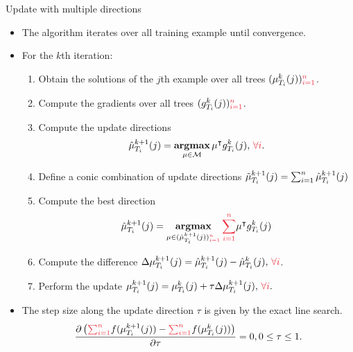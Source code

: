 \documentclass[first=dgreen,second=purple,logo=yellowexc]{aaltoslides}
\begin{document}
\begin{frame}{Update with multiple directions}
	\begin{itemize}\footnotesize
		\item The algorithm iterates over all training example until convergence.
		\item For the $k$th iteration:
		\begin{enumerate}\footnotesize
			\item Obtain the solutions of the $j$th example over all trees $(\vmu_{T_i}^k(j)){\color{aaltored}_{i=1}^n}$.
			\item Compute the gradients over all trees $(g_{T_i}^k(j)){\color{aaltored}_{i=1}^n}$.
			\item Compute the update directions
			\begin{align*}
				\hat{\vmu}_{T_i}^{k+1}(j) = \underset{\vmu\in\Mcal}{\argmax}\,\vmu\tp g_{T_i}^k(j),\,{\color{aaltored}\forall i}.
			\end{align*}
			\item Define a conic combination of update directions $\tilde{\mathbf {\mu}}_{T_i}^{k+1}(j) = \sum_{i=1}^{n}\hat{\mathbf {\mu}}_{T_i}^{k+1}(j)$
			\item Compute the best direction
			\begin{align*}
				\tilde{\vmu}_{T_i}^{k+1}(j) = \underset{\vmu\in(\hat{\vmu}_{T_i}^{k+1}(j)){\color{aaltored}_{i=1}^n}}{\argmax}\,{\color{aaltored}\sum_{i=1}^n}\vmu\tp g_{T_i}^k(j)
			\end{align*}
			\item Compute the difference $\Delta\vmu_{T_i}^{k+1}(j) = \hat{\vmu}_{T_i}^{k+1}(j) - \hat{\vmu}_{T_i}^{k}(j),\,{\color{aaltored}\forall i}$.
			\item Perform the update $\vmu_{T_i}^{k+1}(j) = \vmu_{T_i}^k(j) + \tau\Delta\vmu_{T_i}^{k+1}(j),\,{\color{aaltored}\forall i}.$
		\end{enumerate}
		\item The step size along the update direction $\tau$ is given by the exact line search.
		\begin{align*}\footnotesize
			\frac{\partial \left({\color{aaltored}\sum_{i=1}^n}f(\vmu_{T_i}^{k+1}(j))-{\color{aaltored}\sum_{i=1}^n}f(\vmu_{T_i}^k(j))\right)}{\partial \tau} = 0, 0\le\tau\le1.
		\end{align*}
	\end{itemize}
\end{frame}


\end{document}

